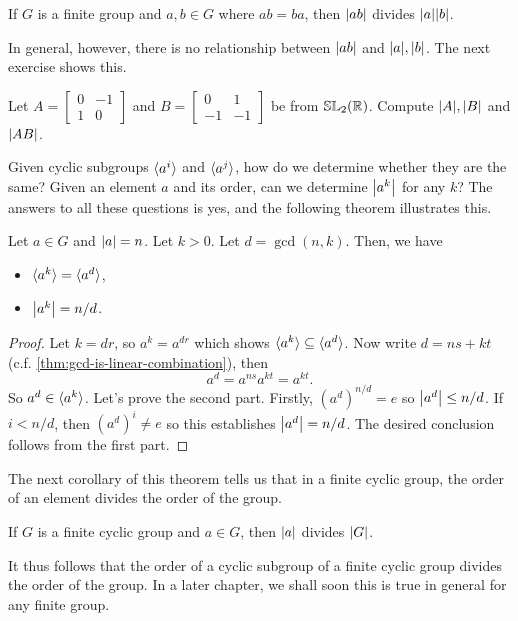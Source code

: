 \documentclass[./main.tex]{subfiles}
\begin{document}
\begin{corollary}
    If $G$ is a finite group and $a, b \in G$ where $ab=ba$, then $\abs{ab}$
    divides $\abs a \abs b$.
\end{corollary}
In general, however, there is no relationship between $\abs{ab}$ and $\abs a,
\abs b$. The next exercise shows this.

\begin{exercise}
    Let $A = \begin{bmatrix} 0 & -1\\ 1 & 0 \end{bmatrix}$ and $B =
    \begin{bmatrix} 0 & 1 \\ -1 & -1 \end{bmatrix}$ be from
    $\mathbb{SL}_2(\mathbb{R})$. Compute $\abs A, \abs B$ and $\abs{AB}$.
\end{exercise}

Given cyclic subgroups ${ \langle a^i \rangle }$ and ${ \langle a^j \rangle }$, how do we determine whether
they are the same? Given an element $a$ and its order, can we determine
$\abs{a^k}$ for any $k$? The answers to all these questions is yes, and the
following theorem illustrates this.
\begin{theorem}
\label{thm:criterion-for-cyclic-subgrou-equivalence}
    Let $a \in G$ and $\abs a = n$. Let $k > 0$. Let $d = \gcd(n, k)$. Then, we
    have
    \begin{itemize}
        \item ${ \langle a^k \rangle } = { \langle a^d \rangle }$,
        \item $\abs{a^k} = n/d$.
    \end{itemize}
\end{theorem}
\begin{proof}
    Let $k = dr$, so $a^k = a^{dr}$ which shows ${ \langle a^k \rangle } \subseteq { \langle a^d \rangle }$.
    Now write $d = ns + kt$ (c.f. \cref{thm:gcd-is-linear-combination}), then
    \[
        a^d = a^{ns} a^{kt} = a^{kt}. 
    \]
    So $a^d \in { \langle a^k \rangle }$. Let's prove the second part. Firstly, $(a^d)^{n/d} =
    e$ so $\abs{a^d} \leq n/d$. If $i < n/d$, then $(a^d)^i \neq e$ so this
    establishes $\abs{a^d} = n/d$. The desired conclusion follows from the first
    part.
\end{proof}

The next corollary of this theorem tells us that in a finite cyclic group, the
order of an element divides the order of the group.
\begin{corollary}
\label{cor:order-element-divides-order-group-fin-cyclic-group}
    If $G$ is a finite cyclic group and $a \in G$, then $\abs a$ divides $\abs
    G$.
\end{corollary}
It thus follows that the order of a cyclic subgroup of a finite cyclic group divides
the order of the group. In a later chapter, we shall soon this is true in
general for any finite group.
\end{document}
